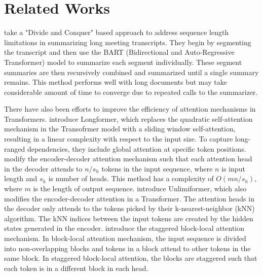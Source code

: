 \section{Related Works}
\label{sec:related-works}

\citet{golia2024action} take a "Divide and Conquer" based approach to address
sequence length limitations in summarizing long meeting transcripts.
They begin by segmenting the transcript and then use the BART (Bidirectional and
Auto-Regressive Transformer) model to summarize each segment individually.
These segment summaries are then recursively combined and summarized until a single
summary remains.
This method performs well with long documents but may take considerable amount of time
to converge due to repeated calls to the summarizer.

There have also been efforts to improve the efficiency of attention mechanisms in Transformers.
\citet{beltagy2020longformer} introduce Longformer, which replaces the quadratic
self-attention mechanism in the Transofrmer model with a sliding window self-attention,
resulting in a linear complexity with respect to the input size.
To capture long-ranged dependencies, they include global attention at specific token positions.
\citet{huang-etal-2021-efficient} modify the encoder-decoder attention mechanism such that
each attention head in the decoder attends to $n/s_h$ tokens in the input sequence, where
$n$ is input length and $s_h$ is number of heads.
This method has a complexity of $O(mn/s_h)$, where $m$ is the length of output sequence.
\citet{bertsch2023unlimiformer} introduce Unlimiformer, which also modifies the encoder-decoder
attention in a Transformer.
The attention heads in the decoder only attends to the tokens picked by their
k-nearest-neighbor (kNN) algorithm.
The kNN indices between the input tokens are created by the hidden states generated in the
encoder.
\citet{phang2022investigating} introduce the staggered block-local attention mechanism.
In block-local attention mechanism, the input sequence is divided into non-overlapping blocks
and tokens in a block attend to other tokens in the same block.
In staggered block-local attention, the blocks are staggered such that each token is in a
different block in each head.

